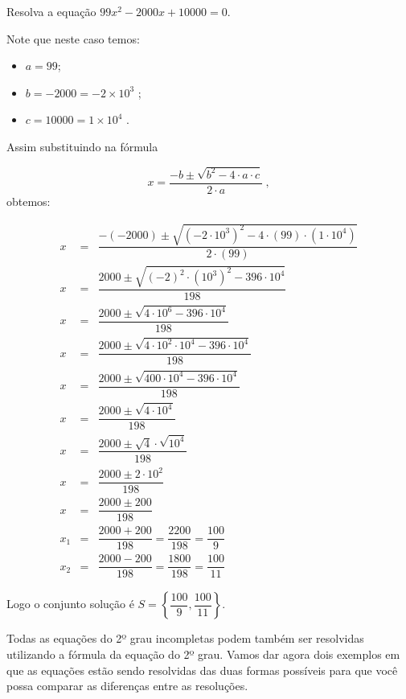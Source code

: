  \begin{exem}
  Resolva a equação $99x^2 - 2000x + 10000= 0$.

 Note que neste caso temos:
  \begin{itemize}
  \item $a= 99$;
  \item $b= -2000= -2 \times 10^3$ ;
  \item $c= 10000= 1 \times 10^4$ .
  \end{itemize}
  Assim substituindo na fórmula

\begin{equation}
x = \dfrac{-b \pm \sqrt{b^2 - 4 \cdot a \cdot c}}{2 \cdot a} \ ,
\end{equation}
 obtemos:

 \begin{eqnarray*}
 x &=& \dfrac{-(-2000) \pm \sqrt{(-2 \cdot 10^3)^2 - 4 \cdot (99) \cdot (1 \cdot 10^4)}}{2 \cdot (99)} \\
 x &=& \dfrac{ 2000 \pm \sqrt{(-2)^2 \cdot (10^3)^2 - 396 \cdot 10^4}}{198} \\
 x &=& \dfrac{ 2000 \pm \sqrt{4 \cdot 10^6 - 396 \cdot 10^4}}{198} \\
 x &=& \dfrac{ 2000 \pm \sqrt{4 \cdot 10^2 \cdot 10^4 - 396 \cdot 10^4}}{198} \\
 x &=& \dfrac{ 2000 \pm \sqrt{400 \cdot 10^4 - 396 \cdot 10^4}}{198} \\
 x &=& \dfrac{ 2000 \pm \sqrt{4 \cdot 10^4}}{198} \\
 x &=& \dfrac{ 2000 \pm \sqrt{4} \cdot \sqrt{10^4}}{198} \\
 x &=& \dfrac{ 2000 \pm 2 \cdot 10^2}{198} \\
 x &=& \dfrac{ 2000 \pm 200}{198} \\
 x_1 &=& \dfrac{ 2000 + 200}{198} = \dfrac{2200}{198} = \dfrac{100}{9} \\
 x_2 &=& \dfrac{ 2000 - 200}{198} = \dfrac{1800}{198} = \dfrac{100}{11}
 \end{eqnarray*}

 Logo o conjunto solução é $S= \left\{ \dfrac{100}{9}, \dfrac{100}{11} \right\}$.
 \end{exem}

\vskip0.3cm

 Todas as equações do 2º grau incompletas podem também ser resolvidas utilizando a fórmula da equação do 2º grau. Vamos dar agora dois exemplos em que as equações estão sendo resolvidas das duas formas possíveis para que você possa comparar as diferenças entre as resoluções.

